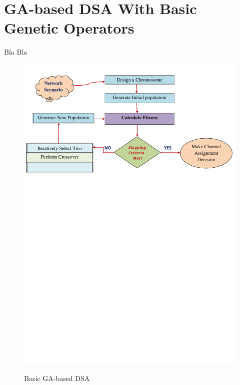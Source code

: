 \chapter{GA-based DSA With Basic Genetic Operators}\label{sec:Pf}
Bla Bla

\begin{figure}[!htb]
\begin{center}
\vspace{-5mm}
\includegraphics [scale=0.75]{algos/GA.pdf}
\vspace{-140mm}
\caption{Basic GA-based DSA}
\vspace{-3mm}
\label{GAlgo}
\end{center}
\end{figure}



